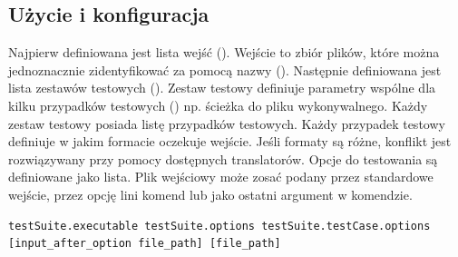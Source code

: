 \documentclass[a4paper,12pt]{article}
\begin{document}


\subsection{Użycie i konfiguracja} \label{benchmarkUsage}

Najpierw definiowana jest lista wejść (). Wejście to zbiór plików, które można jednoznacznie zidentyfikować za pomocą nazwy ().
Następnie definiowana jest lista zestawów testowych (). Zestaw testowy definiuje parametry wspólne dla kilku przypadków testowych () np. ścieżka do pliku wykonywalnego. Każdy zestaw testowy posiada listę przypadków testowych. Każdy przypadek testowy definiuje w jakim formacie oczekuje wejście. Jeśli formaty są różne, konflikt jest rozwiązywany przy pomocy dostępnych translatorów. Opcje do testowania są definiowane jako lista. Plik wejściowy może zosać podany przez standardowe wejście, przez opcję lini komend lub jako ostatni argument w komendzie.

\begin{verbatim}
testSuite.executable testSuite.options testSuite.testCase.options [input_after_option file_path] [file_path]
\end{verbatim}
\end{document}
